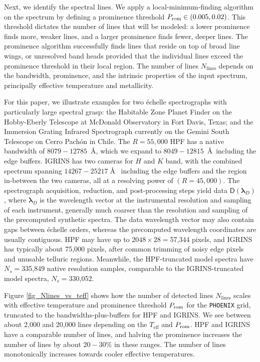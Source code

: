 \documentclass[trackchanges]{aastex631}
\begin{document}
Next, we identify the spectral lines. We apply a local-minimum-finding algorithm \citep{2020SciPy-NMeth} on the spectrum by defining a prominence threshold $P_{\rm rom} \in (0.005, 0.02)$. This threshold dictates the number of lines that will be modeled: a lower prominence finds more, weaker lines, and a larger prominence finds fewer, deeper lines. The prominence algorithm successfully finds lines that reside on top of broad line wings, or unresolved band heads provided that the individual lines exceed the prominence threshold in their local region. The number of lines $N_{\mathrm{lines}}$ depends on the bandwidth, prominence, and the intrinsic properties of the input spectrum, principally effective temperature and metallicity.

For this paper, we illustrate examples for two \'echelle spectrographs with particularly large spectral grasp: the Habitable Zone Planet Finder \citep[HPF,][]{2014SPIE.9147E..1GM} on the Hobby-Eberly Telescope at McDonald Observatory in Fort Davis, Texas; and the Immersion Grating Infrared Spectrograph \citep[IGRINS,][]{park14}
currently on the Gemini South Telescope on Cerro Pach\'on in Chile. The $R=55,000$ HPF has a native bandwidth of $8079-12785$~\AA, which we expand to $8049-12815$~\AA~including the edge buffers. IGRINS has two cameras for $H$ and $K$ band, with the combined spectrum spanning $14267-25217\;$\AA~ including the edge buffers and the region in-between the two cameras, all at a resolving power of $(R=45,000)$. The spectrograph acquisition, reduction, and post-processing steps yield data $\mathsf{D}(\bm{\lambda}_{D})$, where $\bm{\lambda}_{D}$ is the wavelength vector at the instrumental resolution and sampling of each instrument, generally much coarser than the resolution and sampling of the precomputed synthetic spectra. The data wavelength vector may also contain gaps between \'echelle orders, whereas the precomputed wavelength coordinates are usually contiguous. HPF may have up to $2048\times28=$57,344 pixels, and IGRINS has typically about 75,000 pixels, after common trimming of noisy edge pixels and unusable telluric regions.  Meanwhile, the HPF-truncated model spectra have $N_s=$335,849 native resolution samples, comparable to the IGRINS-truncated model spectra, $N_s=$330,052.

Figure \ref{fig_Nlines_vs_teff} shows how the number of detected lines $N_{\mathrm{lines}}$ scales with effective temperature and prominence threshold $P_{\rm rom}$ for the \texttt{PHOENIX} grid, truncated to the bandwidths-plus-buffers for HPF and IGRINS. We see between about 2,000 and 20,000 lines depending on the $T_{\mathrm{eff}}$ and $P_{\rm rom}$. HPF and IGRINS have a comparable number of lines, and halving the prominence increases the number of lines by about $20-30\%$ in these ranges. The number of lines monotonically increases towards cooler effective temperatures.
\end{document}

